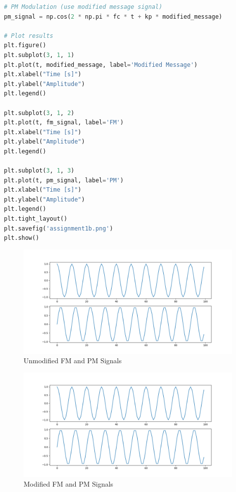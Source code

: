 \documentclass[
	letterpaper, %
	10pt, %
]{CSUniSchoolLabReport}
\begin{document}
\begin{lstlisting}[language=Python]
# PM Modulation (use modified message signal)
pm_signal = np.cos(2 * np.pi * fc * t + kp * modified_message)

# Plot results
plt.figure()
plt.subplot(3, 1, 1)
plt.plot(t, modified_message, label='Modified Message')
plt.xlabel("Time [s]")
plt.ylabel("Amplitude")
plt.legend()

plt.subplot(3, 1, 2)
plt.plot(t, fm_signal, label='FM')
plt.xlabel("Time [s]")
plt.ylabel("Amplitude")
plt.legend()

plt.subplot(3, 1, 3)
plt.plot(t, pm_signal, label='PM')
plt.xlabel("Time [s]")
plt.ylabel("Amplitude")
plt.legend()
plt.tight_layout()
plt.savefig('assignment1b.png')
plt.show()

\end{lstlisting}

\begin{figure}[H] %
	\centering %
	\includegraphics[width=1.2\textwidth]{assignment1.png} %
	\caption{Unmodified FM and PM Signals}
	\label{fig:block}
\end{figure}

\begin{figure}[H] %
	\centering %
	\includegraphics[width=1.2\textwidth]{assignment1.png} %
	\caption{Modified FM and PM Signals}
	\label{fig:block}
\end{figure}
\end{document}
